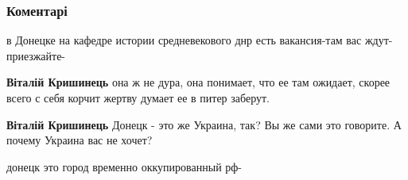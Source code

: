  
 
 
 
 
\subsubsection{Коментарі}

\begin{itemize}
 
в Донецке на кафедре истории средневекового днр есть вакансия-там вас ждут-приезжайте-
\begin{itemize}
 
\textbf{Віталій Кришинець} она ж не дура, она понимает, что ее там ожидает, скорее всего с себя корчит жертву думает ее в питер заберут.

 
\textbf{Віталій Кришинець} Донецк - это же Украина, так? Вы же сами это говорите. А почему Украина вас не хочет?

 
донецк это город временно оккупированный рф-

 

\end{itemize}
\end{itemize}
